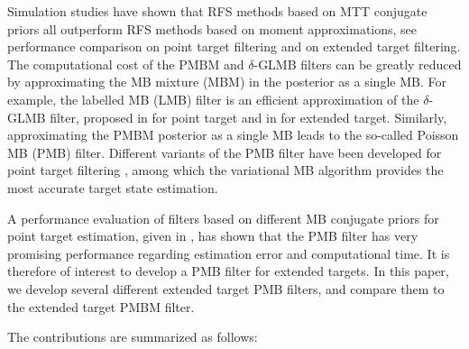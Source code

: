 \documentclass[journal]{IEEEtran}
\begin{document}
Simulation studies have shown that RFS methods based on MTT conjugate priors all outperform RFS methods based on moment approximations, see performance comparison \cite{glmbpoint,lmb,pmbmpoint2} on point target filtering and \cite{lmbextended,pmbmextended,pmbmextended2} on extended target filtering. The computational cost of the PMBM and $\delta$-GLMB filters can be greatly reduced by approximating the MB mixture (MBM) in the posterior as a single MB. For example, the labelled MB (LMB) filter is an efficient approximation of the $\delta$-GLMB filter, proposed in \cite{lmb} for point target and in \cite{lmbextended} for extended target. Similarly, approximating the PMBM posterior as a single MB leads to the so-called Poisson MB (PMB) filter. Different variants of the PMB filter have been developed for point target filtering \cite{pmbmpoint,variational}, among which the variational MB algorithm \cite{variational} provides the most accurate target state estimation. 

A performance evaluation of filters based on different MB conjugate priors for point target estimation, given in \cite{performanceevaluation}, has shown that the PMB filter has very promising performance regarding estimation error and computational time. It is therefore of interest to develop a PMB filter for extended targets. In this paper, we develop several different extended target PMB filters, and compare them to the extended target PMBM filter. 

The contributions are summarized as follows:


\end{document}
